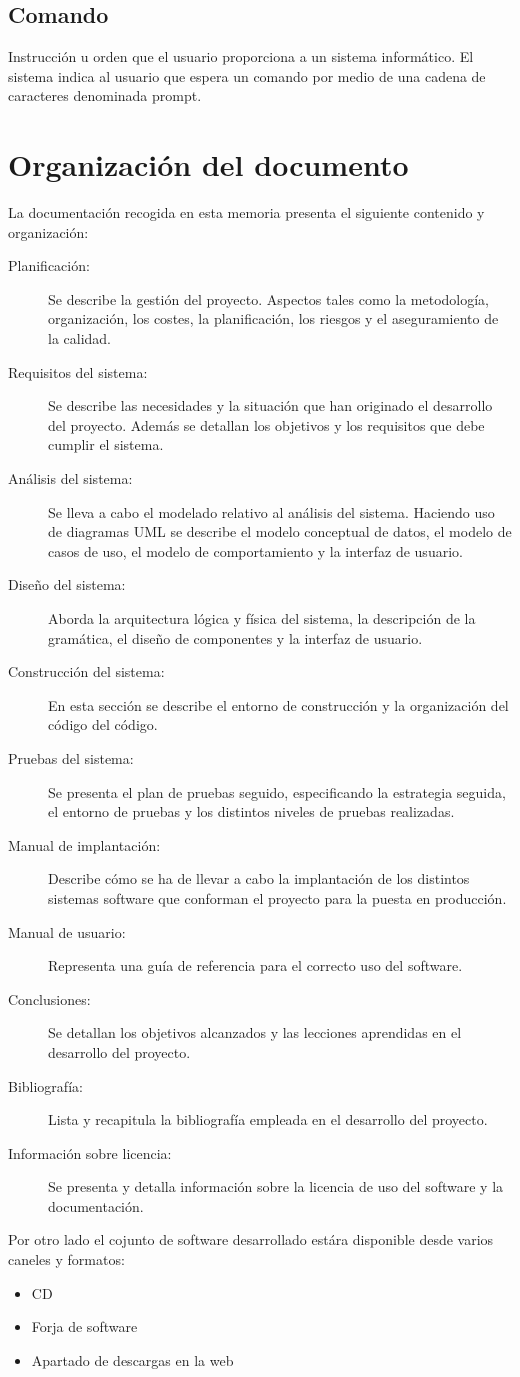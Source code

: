 \subsection {Comando}
Instrucción u orden que el usuario proporciona a un sistema informático. El sistema indica al usuario que espera un comando por medio de una cadena de caracteres denominada prompt. 

\section{Organización del documento}
La documentación recogida en esta memoria presenta el siguiente contenido y organización:

\begin {description}
\item [Planificación:] Se describe la gestión del proyecto. Aspectos tales como la metodología, organización, 
los costes, la planificación, los riesgos y el aseguramiento de la calidad. 
\item [Requisitos del sistema:] Se describe las necesidades y la situación que han originado el desarrollo del proyecto. Además 
se detallan los objetivos y los requisitos que debe cumplir el sistema. 
\item [Análisis del sistema:] Se lleva a cabo el modelado  relativo al análisis del sistema. Haciendo uso de diagramas UML se 
describe el modelo conceptual de datos, el modelo de casos de uso, el modelo de comportamiento y la interfaz de usuario. 
\item [Diseño del sistema:] Aborda la arquitectura lógica y física del sistema, la descripción de la gramática, el diseño de componentes y la
interfaz de usuario.
\item [Construcción del sistema:] En esta sección se describe el entorno de construcción y la organización del código del código.
\item [Pruebas del sistema:] Se presenta el plan de pruebas seguido, especificando la estrategia seguida, el entorno de pruebas y los distintos
niveles de pruebas realizadas.
\item [Manual de implantación:] Describe cómo se ha de llevar a cabo la implantación de los distintos sistemas software que 
conforman el proyecto para la puesta en producción. 
\item [Manual de usuario:] Representa una guía de referencia para el correcto uso del software.
\item [Conclusiones:] Se detallan los objetivos alcanzados y las lecciones aprendidas en el desarrollo del proyecto.
\item [Bibliografía:] Lista y recapitula la bibliografía empleada en el desarrollo del proyecto.
\item [Información sobre licencia:] Se presenta y detalla información sobre la licencia de uso del software y la documentación.
\end{description}

Por otro lado el cojunto de software desarrollado estára disponible desde varios caneles y formatos:
\begin{itemize}
\item CD 
\item Forja de software
\item Apartado de descargas en la web
\end{itemize}
